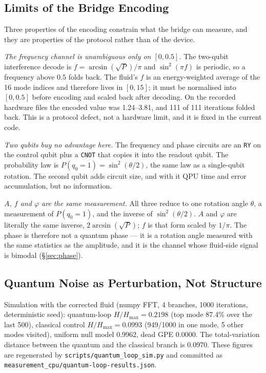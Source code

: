 \documentclass[sigconf,anonymous=false]{acmart}
\begin{document}
\subsection{Limits of the Bridge Encoding}
\label{sec:bridge-limits}

Three properties of the encoding constrain what the bridge can measure, and they are
properties of the protocol rather than of the device.

\emph{The frequency channel is unambiguous only on $[0,0.5]$.} The two-qubit interference
decode is $f = \arcsin(\sqrt{P})/\pi$ and $\sin^2(\pi f)$ is periodic, so a frequency above
$0.5$ folds back. The fluid's $f$ is an energy-weighted average of the 16 mode indices and
therefore lives in $[0,15]$; it must be normalised into $[0,0.5]$ before encoding and scaled
back after decoding. On the recorded hardware files the encoded value was 1.24--3.81, and
111 of 111 iterations folded back. This is a protocol defect, not a hardware limit, and it is
fixed in the current code.

\emph{Two qubits buy no advantage here.} The frequency and phase circuits are an \texttt{RY} on
the control qubit plus a \texttt{CNOT} that copies it into the readout qubit. The probability
law is $P(q_0=1) = \sin^2(\theta/2)$, the same law as a single-qubit rotation. The second
qubit adds circuit size, and with it QPU time and error accumulation, but no information.

\emph{$A$, $f$ and $\varphi$ are the same measurement.} All three reduce to one rotation angle
$\theta$, a measurement of $P(q_0=1)$, and the inverse of $\sin^2(\theta/2)$. $A$ and
$\varphi$ are literally the same inverse, $2\arcsin(\sqrt{P})$; $f$ is that form scaled by
$1/\pi$. The phase is therefore not a quantum phase --- it is a rotation angle measured with
the same statistics as the amplitude, and it is the channel whose fluid-side signal is
bimodal (\S\ref{sec:phase}).

\subsection{Quantum Noise as Perturbation, Not Structure}
\label{sec:quantum-noise}
Simulation with the corrected fluid (numpy FFT, 4 branches, 1000 iterations, deterministic seed):
quantum-loop $H/H_{\max} = 0.2198$ (top mode 87.4\% over the last 500), classical control
$H/H_{\max} = 0.0993$ (949/1000 in one mode, 5 other modes visited), uniform null model 0.9962,
dead GPE 0.0000. The total-variation distance between the quantum and the classical branch is
0.0970. These figures are regenerated by \texttt{scripts/quantum\_loop\_sim.py} and committed as
\texttt{measurement\_cpu/quantum-loop-results.json}.
\end{document}

